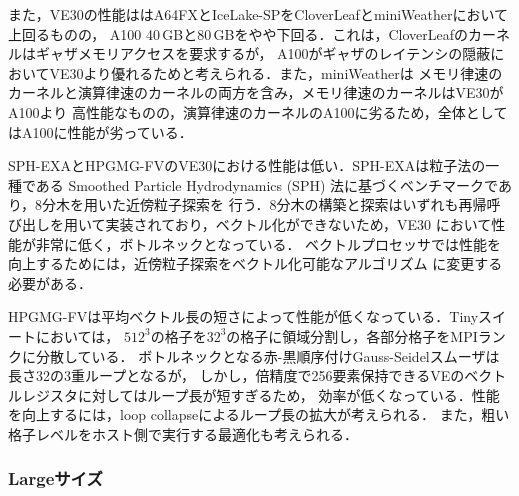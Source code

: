 ﻿\documentclass[submit,techrep,noauthor]{ipsj}
\begin{document}
また，VE30の性能ははA64FXとIceLake-SPをCloverLeafとminiWeatherにおいて上回るものの，
A100 40\,GBと80\,GBをやや下回る．これは，CloverLeafのカーネルはギャザメモリアクセスを要求するが，
A100がギャザのレイテンシの隠蔽においてVE30より優れるためと考えられる．また，miniWeatherは
メモリ律速のカーネルと演算律速のカーネルの両方を含み，メモリ律速のカーネルはVE30がA100より
高性能なものの，演算律速のカーネルのA100に劣るため，全体としてはA100に性能が劣っている．

SPH-EXAとHPGMG-FVのVE30における性能は低い．SPH-EXAは粒子法の一種である
Smoothed Particle Hydrodynamics (SPH) 法に基づくベンチマークであり，8分木を用いた近傍粒子探索を
行う．8分木の構築と探索はいずれも再帰呼び出しを用いて実装されており，ベクトル化ができないため，VE30
において性能が非常に低く，ボトルネックとなっている．
ベクトルプロセッサでは性能を向上するためには，近傍粒子探索をベクトル化可能なアルゴリズム
に変更する必要がある．

HPGMG-FVは平均ベクトル長の短さによって性能が低くなっている．Tinyスイートにおいては，
$512^3$の格子を$32^3$の格子に領域分割し，各部分格子をMPIランクに分散している．
ボトルネックとなる赤-黒順序付けGauss-Seidelスムーザは長さ32の3重ループとなるが，
しかし，倍精度で256要素保持できるVEのベクトルレジスタに対してはループ長が短すぎるため，
効率が低くなっている．性能を向上するには，loop collapseによるループ長の拡大が考えられる．
また，粗い格子レベルをホスト側で実行する最適化も考えられる．

\subsubsection{Largeサイズ}
\end{document}

